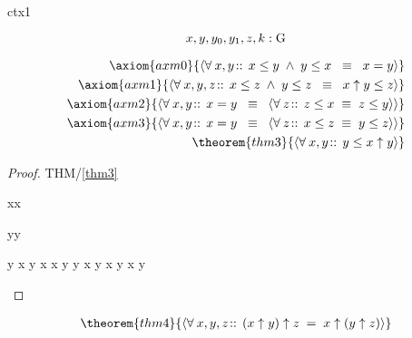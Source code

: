 \documentclass[12pt]{amsart}
\begin{document}
\begin{context}{ctx1}


\[ x,y,y_0,y_1,z,k: \text{G} \]

\precedence{[[\uparrow],[\le]]}
\begin{align}
\axiom{axm0}{ 
	\qforall{x,y}{}{ x \le y \1\land y \le x \2\equiv x = y } } 
\\ \axiom{axm1}{ 
	\qforall{x,y,z}{}{ x \le z \1\land y \le z \2\equiv 
		x \uparrow y \le z } }
\\ \axiom{axm2}{ 
	\qforall{x,y}{}{ x = y \2\equiv \qforall{z}{}{ z \le x \1\equiv z \le y } } }
\\ \axiom{axm3}{ 
	\qforall{x,y}{}{ x = y \2\equiv \qforall{z}{}{ x \le z \1\equiv y \le z } } }
\\ \theorem{thm3}{ \qforall{x,y}{}{ y \le x \uparrow y } }
\end{align}

\begin{proof}{THM/\ref{thm3}}
	\begin{free:var}{x}{x}
	\begin{free:var}{y}{y}
\begin{calculation}
		y \le x \uparrow y
		x \le x \uparrow y
	\2\land	y \le x \uparrow y
	\hint{=}{ \eqref{axm1} \eqref{thm5} }
		x \uparrow y \1\le x \uparrow y
	\hint{=}{ \eqref{axm0} }
		\true
\end{calculation}
	\end{free:var}
	\end{free:var}
\end{proof}

\begin{align}
\theorem{thm4}{ \qforall{x,y,z}{}{ (x \uparrow y) \uparrow z \1= x \uparrow (y \uparrow z) } }
\end{align}


\end{context}
\end{document}
